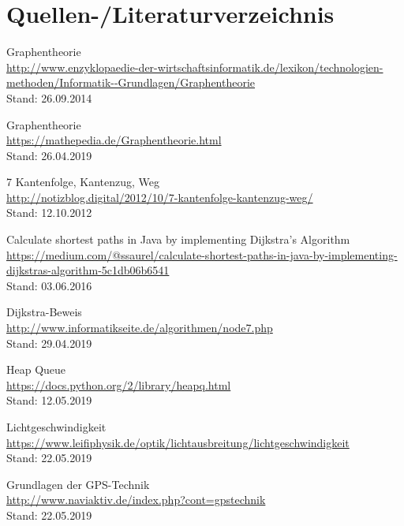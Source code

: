 \documentclass[12pt]{article}
\begin{document}
\newpage
\section{Quellen-/Literaturverzeichnis}
	\begin{thebibliography}{xxxxxxxxxxxxxxxxxxxxxxxxxxxxx}
		 Graphentheorie\\ 				\url{http://www.enzyklopaedie-der-wirtschaftsinformatik.de/lexikon/technologien-methoden/Informatik--Grundlagen/Graphentheorie}\\
		Stand: 26.09.2014
		
		 Graphentheorie\\
		\url{https://mathepedia.de/Graphentheorie.html}\\
		Stand: 26.04.2019
		
		 7 Kantenfolge, Kantenzug, Weg\\ \url{http://notizblog.digital/2012/10/7-kantenfolge-kantenzug-weg/}\\
		Stand: 12.10.2012
		
		 Calculate shortest paths in Java by implementing Dijkstra’s Algorithm\\ \url{https://medium.com/@ssaurel/calculate-shortest-paths-in-java-by-implementing-dijkstras-algorithm-5c1db06b6541}\\ Stand: 03.06.2016
		
		 Dijkstra-Beweis\\
		\url{http://www.informatikseite.de/algorithmen/node7.php}\\
		Stand: 29.04.2019
		
		 Heap Queue\\
		\url{https://docs.python.org/2/library/heapq.html}\\
		Stand: 12.05.2019
		
		 Lichtgeschwindigkeit\\ \url{https://www.leifiphysik.de/optik/lichtausbreitung/lichtgeschwindigkeit}\\
		Stand: 22.05.2019
		
		 Grundlagen der GPS-Technik\\
		\url{http://www.naviaktiv.de/index.php?cont=gpstechnik}\\
		Stand: 22.05.2019
		

\end{thebibliography}
\end{document}
